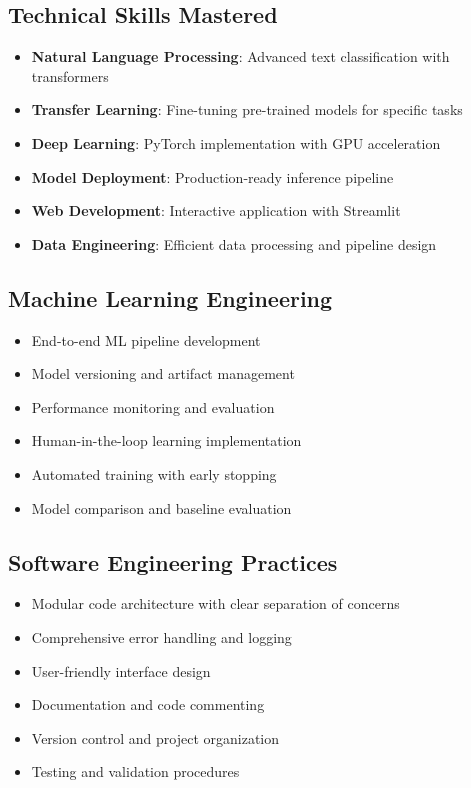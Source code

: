 \documentclass[11pt,a4paper]{article}
\begin{document}
\subsection{Technical Skills Mastered}
\begin{itemize}
  \item \textbf{Natural Language Processing}: Advanced text classification with transformers
  \item \textbf{Transfer Learning}: Fine-tuning pre-trained models for specific tasks
  \item \textbf{Deep Learning}: PyTorch implementation with GPU acceleration
  \item \textbf{Model Deployment}: Production-ready inference pipeline
  \item \textbf{Web Development}: Interactive application with Streamlit
  \item \textbf{Data Engineering}: Efficient data processing and pipeline design
\end{itemize}

\subsection{Machine Learning Engineering}
\begin{itemize}
  \item End-to-end ML pipeline development
  \item Model versioning and artifact management
  \item Performance monitoring and evaluation
  \item Human-in-the-loop learning implementation
  \item Automated training with early stopping
  \item Model comparison and baseline evaluation
\end{itemize}

\subsection{Software Engineering Practices}
\begin{itemize}
  \item Modular code architecture with clear separation of concerns
  \item Comprehensive error handling and logging
  \item User-friendly interface design
  \item Documentation and code commenting
  \item Version control and project organization
  \item Testing and validation procedures
\end{itemize}
\end{document}
